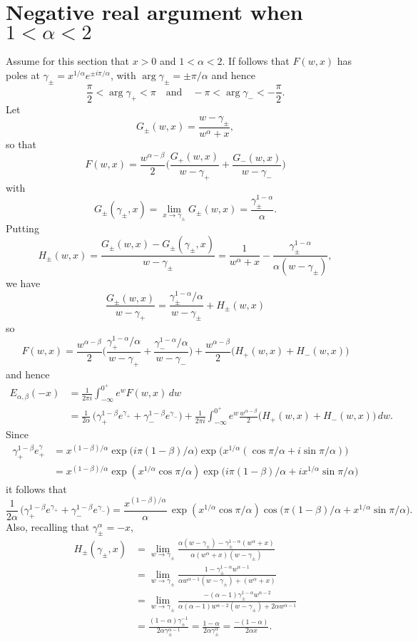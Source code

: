 \documentclass[12pt,a4paper]{article}
\begin{document}
\section{Negative real argument when $1<\alpha<2$}
Assume for this section that $x>0$ and $1<\alpha<2$.  If follows that $F(w,x)$
has poles at $\gamma_\pm=x^{1/\alpha}e^{\pm i\pi/\alpha}$, 
with $\arg\gamma_\pm=\pm\pi/\alpha$ and hence
\[
\frac{\pi}{2}<\arg\gamma_+<\pi
\quad\text{and}\quad
-\pi<\arg\gamma_-<-\frac{\pi}{2}.
\]
Let
\[
G_\pm(w,x)=\frac{w-\gamma_\pm}{w^\alpha+x},
\]
so that
\[
F(w,x)=\frac{w^{\alpha-\beta}}{2}\biggl(\frac{G_+(w,x)}{w-\gamma_+}
    +\frac{G_-(w,x)}{w-\gamma_-}\biggr)
\]
with
\[
G_\pm(\gamma_\pm,x)=\lim_{x\to\gamma_\pm}G_\pm(w,x)
    =\frac{\gamma_\pm^{1-\alpha}}{\alpha}.
\]
Putting
\[
H_\pm(w,x)=\frac{G_\pm(w,x)-G_\pm(\gamma_\pm,x)}{w-\gamma_\pm}
    =\frac{1}{w^\alpha+x}-\frac{\gamma_\pm^{1-\alpha}}{\alpha(w-\gamma_\pm)},
\]
we have
\[
\frac{G_\pm(w,x)}{w-\gamma_+}=\frac{\gamma_\pm^{1-\alpha}/\alpha}{w-\gamma_\pm}
    +H_\pm(w,x)
\]
so
\[
F(w,x)=\frac{w^{\alpha-\beta}}{2}\biggl(
     \frac{\gamma_+^{1-\alpha}/\alpha}{w-\gamma_+}
    +\frac{\gamma_-^{1-\alpha}/\alpha}{w-\gamma_-}\biggr)
    +\frac{w^{\alpha-\beta}}{2}\bigl(H_+(w,x)+H_-(w,x)\bigr)
\]
and hence
\begin{align*}
E_{\alpha,\beta}(-x)&=\frac{1}{2\pi i}\int_{-\infty}^{0^+}e^wF(w,x)\,dw\\
&=\frac{1}{2\alpha}\,\bigl(\gamma_+^{1-\beta}e^{\gamma_+}
    +\gamma_-^{1-\beta}e^{\gamma_-}\bigr)
     +\frac{1}{2\pi i}\int_{-\infty}^{0^+}
    e^w\frac{w^{\alpha-\beta}}{2} \bigl(H_+(w,x)+H_-(w,x)\bigr)\,dw.
\end{align*}
Since
\begin{align*}
\gamma_+^{1-\beta}e^\gamma_+&=x^{(1-\beta)/\alpha}
    \exp\bigl(i\pi(1-\beta)/\alpha\bigr)
    \exp\bigl(x^{1/\alpha}(\cos\pi/\alpha+i\sin\pi/\alpha)\bigr)\\
    &=x^{(1-\beta)/\alpha}\exp(x^{1/\alpha}\cos\pi/\alpha)
    \exp\bigl(i\pi(1-\beta)/\alpha+ix^{1/\alpha}\sin\pi/\alpha\bigr)
\end{align*}
it follows that
\[
\frac{1}{2\alpha}\,\bigl(\gamma_+^{1-\beta}e^{\gamma_+}
    +\gamma_-^{1-\beta}e^{\gamma_-}\bigr)
    =\frac{x^{(1-\beta)/\alpha}}{\alpha}\,\exp(x^{1/\alpha}\cos\pi/\alpha)
    \cos\bigl(\pi(1-\beta)/\alpha+x^{1/\alpha}\sin\pi/\alpha\bigr).
\]
Also, recalling that $\gamma_\pm^\alpha=-x$,
\begin{align*}
H_\pm(\gamma_\pm,x)&=\lim_{w\to\gamma_\pm}
\frac{\alpha(w-\gamma_\pm)-\gamma_\pm^{1-\alpha}(w^\alpha+x)}%
{\alpha(w^\alpha+x)(w-\gamma_\pm)}\\
    &=\lim_{w\to\gamma_\pm}\frac{1-\gamma_\pm^{1-\alpha}w^{\alpha-1}}%
{\alpha w^{\alpha-1}(w-\gamma_\pm)+(w^\alpha+x)}\\
&=\lim_{w\to\gamma_\pm}\frac{-(\alpha-1)\gamma_\pm^{1-\alpha}w^{\alpha-2}}%
{\alpha(\alpha-1)w^{\alpha-2}(w-\gamma_\pm)+2\alpha w^{\alpha-1}}\\
&=\frac{(1-\alpha)\gamma_\pm^{-1}}{2\alpha\gamma_\pm^{\alpha-1}}
=\frac{1-\alpha}{2\alpha\gamma_\pm^\alpha}=\frac{-(1-\alpha)}{2\alpha x}.
\end{align*}
\end{document}
